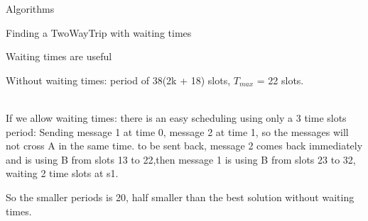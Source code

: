 \documentclass[a4paper,10pt]{report}
\begin{document}
\begin{chapter}{Algorithms}
\begin{section}{Finding a TwoWayTrip with waiting times}
\begin{subsection}{Waiting times are useful}
{{{
  } 
  Without waiting times: period of 38(2k + 18) slots, $T_{max}$ = 22 slots.
  }}\\
 


If we allow waiting times: there is an easy scheduling using only a 3 time slots period: 
Sending message 1 at time 0, message 2 at time 1, so the messages will not cross A in the same time. to be sent back,
message 2 comes back immediately and is using B from slots 13 to 22,then message 1 is using B from slots 23 to 32, waiting 2 time slots at s1.

So the smaller periods is 20, half smaller than the best solution without waiting times.\\

\end{subsection}
\end{section}
\end{chapter}
\end{document}
